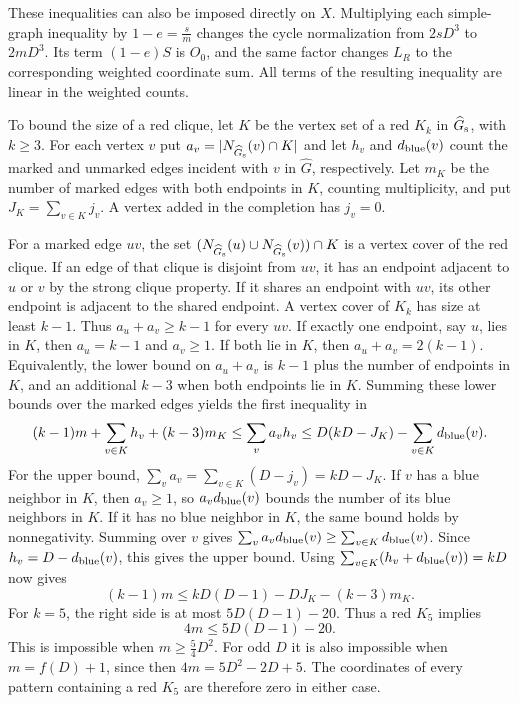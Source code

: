 \documentclass[preprint,11pt,numbers]{elsarticle-arxiv}
\numberwithin{equation}{section}
\theoremstyle{definition}
\begin{document}
These inequalities can also be imposed directly on $X$. Multiplying
each simple-graph inequality by $1-e=\frac{s}{m}$ changes the cycle
normalization from $2sD^3$ to $2mD^3$. Its term $(1-e)S$ is $O_0$,
and the same factor changes $L_R$ to the corresponding weighted
coordinate sum. All terms of the resulting inequality are linear
in the weighted counts.

To bound the size of a red clique, let $K$ be the vertex set of
a red $K_k$ in $\widehat G_{\rm s}$, with $k\geq3$. For each
vertex $v$ put $a_v=|N_{\widehat G_{\rm s}}(v)\cap K|$ and let
$h_v$ and $d_{\rm blue}(v)$ count the marked and unmarked edges
incident with $v$ in $\widehat G$, respectively. Let $m_K$ be
the number of marked edges with both endpoints in $K$, counting
multiplicity, and put $J_K=\sum_{v\in K}j_v$. A vertex added in
the completion has $j_v=0$.

For a marked edge $uv$, the set
$(N_{\widehat G_{\rm s}}(u)\cup N_{\widehat G_{\rm s}}(v))\cap K$
is a vertex cover of the red clique. If an edge of that clique
is disjoint from $uv$, it has an endpoint adjacent to $u$ or $v$
by the strong clique property. If it shares an endpoint with
$uv$, its other endpoint is adjacent to the shared endpoint.
A vertex cover of $K_k$ has size at least $k-1$. Thus
$a_u+a_v\geq k-1$ for every $uv$. If exactly one endpoint,
say $u$, lies in $K$, then $a_u=k-1$ and $a_v\geq1$. If both
lie in $K$, then $a_u+a_v=2(k-1)$. Equivalently, the lower bound
on $a_u+a_v$ is $k-1$ plus the number of endpoints in $K$, and
an additional $k-3$ when both endpoints lie in $K$. Summing these
lower bounds over the marked edges yields the first inequality in
\[
 (k-1)m+\sum_{v\in K}h_v+(k-3)m_K
 \le\sum_v a_vh_v
 \le D(kD-J_K)-\sum_{v\in K}d_{\rm blue}(v).
\]
For the upper bound, $\sum_v a_v=\sum_{v\in K}(D-j_v)=kD-J_K$.
If $v$ has a blue neighbor in $K$, then $a_v\geq1$, so
$a_vd_{\rm blue}(v)$ bounds the number of its blue neighbors
in $K$. If it has no blue neighbor in $K$, the same bound holds
by nonnegativity. Summing over $v$ gives
$\sum_v a_vd_{\rm blue}(v)\geq\sum_{v\in K}d_{\rm blue}(v)$.
Since $h_v=D-d_{\rm blue}(v)$, this gives the upper bound.
Using $\sum_{v\in K}(h_v+d_{\rm blue}(v))=kD$ now gives
\[
 (k-1)m\le kD(D-1)-DJ_K-(k-3)m_K.
\]
For $k=5$, the right side is at most $5D(D-1)-20$. Thus a red $K_5$
implies
\begin{equation}\label{eq:red-k5-bound}
 4m\leq5D(D-1)-20.
\end{equation}
This is impossible when $m\geq\frac54D^2$. For odd $D$ it is also
impossible when $m=f(D)+1$, since then $4m=5D^2-2D+5$.
The coordinates of every pattern containing a red $K_5$ are
therefore zero in either case.
\end{document}
